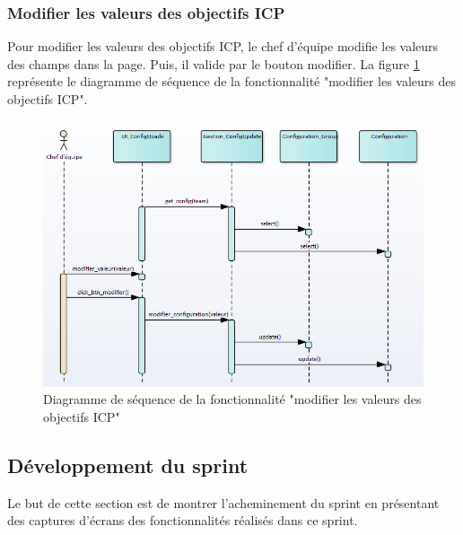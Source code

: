 \subsubsection{Modifier les valeurs des objectifs ICP}
Pour modifier les valeurs des objectifs ICP, le chef d'équipe modifie les valeurs des champs dans la page. Puis, il valide par le bouton modifier.
La figure \ref{code75} représente le diagramme de séquence de la fonctionnalité "modifier les valeurs des objectifs ICP".
\begin{figure}[H]
  \centering
 \includegraphics[scale=0.69]{figures/diagrams/sequence/config_seq_diag.png}
 \caption{Diagramme de séquence de la fonctionnalité "modifier les valeurs des objectifs ICP"}
 \label{code75}
\end{figure}

\subsection{Développement du sprint}
Le but de cette section est de montrer l'acheminement du sprint en présentant des captures d'écrans des fonctionnalités réalisés dans ce sprint.

